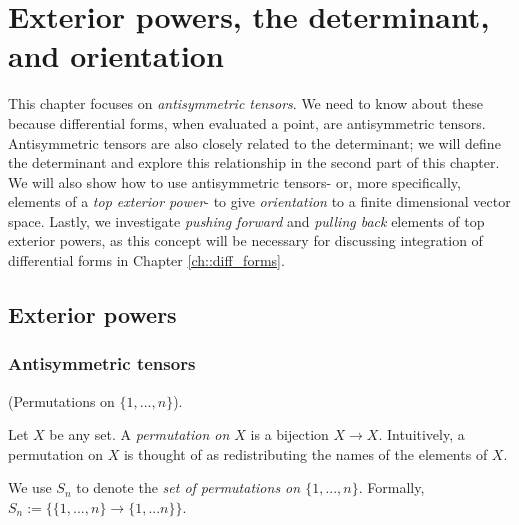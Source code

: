 \chapter{Exterior powers, the determinant, and orientation}
\label{ch::exterior_pwrs}

This chapter focuses on \textit{antisymmetric tensors}. We need to know about these because differential forms, when evaluated a point, are antisymmetric tensors. Antisymmetric tensors are also closely related to the determinant; we will define the determinant and explore this relationship in the second part of this chapter. We will also show how to use antisymmetric tensors- or, more specifically, elements of a \textit{top exterior power}- to give \textit{orientation} to a finite dimensional vector space. Lastly, we investigate \textit{pushing forward} and \textit{pulling back} elements of top exterior powers, as this concept will be necessary for discussing integration of differential forms in Chapter \ref{ch::diff_forms}.

\section{Exterior powers}

\subsection*{Antisymmetric tensors}

\begin{defn}
    (Permutations on $\{1, ..., n\}$).
    
    Let $X$ be any set. A \textit{permutation on $X$} is a bijection $X \rightarrow X$. Intuitively, a permutation on $X$ is thought of as redistributing the names of the elements of $X$.
    
    We use $S_n$ to denote the \textit{set of permutations on $\{1, ..., n\}$}. Formally, $S_n := \{ \text{$\{1, ..., n\} \rightarrow \{1, ... n \}$} \}$.
\end{defn}

